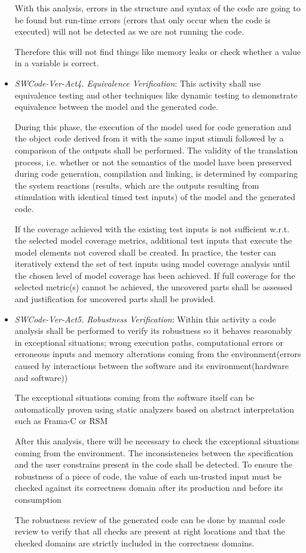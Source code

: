 \documentclass{template/openetcs_report}
\begin{document}
\begin{itemize}
With this analysis, errors in the structure and syntax of the code are going to be found but run-time errors (errors that only occur when the code is executed) will not be detected as we are not running the code.

Therefore this will not find things like memory leaks or check whether a value in a variable is correct.

\item {\it SWCode-Ver-Act4. Equivalence Verification}: This activity shall use equivalence testing and other techniques like dynamic testing to demonstrate equivalence between the model and the generated code.
 
During this phase, the execution of the model used for code generation and the object code derived from it with the same input stimuli followed by a comparison of the outputs shall be performed. The validity of the translation process, i.e. whether or not the semantics of the model have been preserved during code generation, compilation and linking, is determined by comparing the system reactions (results, which are the outputs resulting from stimulation with identical timed test inputs) of the model and the generated code.

If the coverage achieved with the existing test inputs is not sufficient w.r.t. the selected model coverage metrics, additional test inputs that execute the model elements not covered shall be created. In practice, the tester can iteratively extend the set of test inputs using model coverage analysis until the chosen level of model coverage has been achieved. If full coverage for the selected metric(s) cannot be achieved, the uncovered parts shall be assessed and justification for uncovered parts shall be provided.
\item {\it SWCode-Ver-Act5. Robustness Verification}: Within this activity a code analysis shall be performed to verify its robustness so it behaves reasonably in exceptional situations; wrong execution paths, computational errors or erroneous inputs and memory alterations coming from the environment(errors caused by interactions between the software and its environment(hardware and software))

The exceptional situations coming from the software itself can be automatically proven using static analyzers based on abstract interpretation such as Frama-C or RSM

After this analysis, there will be necessary to check the exceptional situations coming from the environment. The inconsistencies between the specification and the user constrains present in the code shall be detected. To ensure the robustness of a piece of code, the value of each un-trusted input must be checked against its correctness domain after its production and before its consumption

The robustness review of the generated code can be done by manual code review to verify that all checks are present at right locations and that the checked domains are strictly included in the correctness domains.
\end{itemize}
\end{document}
